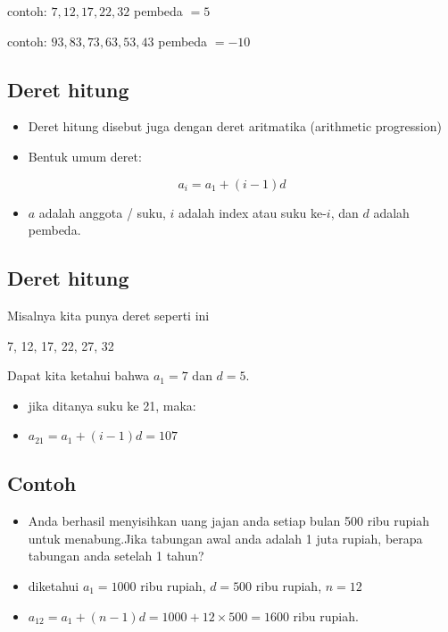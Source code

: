 \documentclass[
  letterpaper,
  DIV=11,
  numbers=noendperiod]{scrartcl}
\providecommand{\tightlist}{%
  \setlength{\itemsep}{0pt}\setlength{\parskip}{0pt}}\usepackage{longtable,booktabs,array}
\begin{document}
contoh: \(7,12,17,22,32\) pembeda \(=5\)

contoh: \(93, 83, 73,63,53,43\) pembeda \(=-10\)

\hypertarget{deret-hitung-1}{%
\subsection{Deret hitung}\label{deret-hitung-1}}

\begin{itemize}
\item
  Deret hitung disebut juga dengan deret aritmatika (arithmetic
  progression)
\item
  Bentuk umum deret:
\end{itemize}

\[
a_i=a_1+(i-1)d
\]

\begin{itemize}
\tightlist
\item
  \(a\) adalah anggota / suku, \(i\) adalah index atau suku ke-\(i\),
  dan \(d\) adalah pembeda.
\end{itemize}

\hypertarget{deret-hitung-2}{%
\subsection{Deret hitung}\label{deret-hitung-2}}

Misalnya kita punya deret seperti ini

7, 12, 17, 22, 27, 32

Dapat kita ketahui bahwa \(a_1=7\) dan \(d=5\).

\begin{itemize}
\item
  jika ditanya suku ke 21, maka:
\item
  \(a_21=a_1+(i-1)d=107\)
\end{itemize}

\hypertarget{contoh-3}{%
\subsection{Contoh}\label{contoh-3}}

\begin{itemize}
\item
  Anda berhasil menyisihkan uang jajan anda setiap bulan 500 ribu rupiah
  untuk menabung.Jika tabungan awal anda adalah 1 juta rupiah, berapa
  tabungan anda setelah 1 tahun?
\item
  diketahui \(a_1=1000\) ribu rupiah, \(d=500\) ribu rupiah, \(n=12\)
\item
  \(a_12=a_1+(n-1)d=1000+12\times 500=1600\) ribu rupiah.
\end{itemize}
\end{document}
